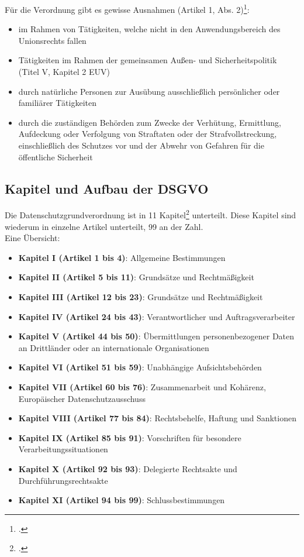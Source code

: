 Für die Verordnung gibt es gewisse Ausnahmen (Artikel 1, Abs. 2)\footcite{Lehrunterlagen-HTL-cloud}:
\begin{itemize}
	\item im Rahmen von Tätigkeiten, welche nicht in den Anwendungsbereich des Unionsrechts fallen
	\item Tätigkeiten im Rahmen der gemeinsamen Außen- und Sicherheitspolitik (Titel V, Kapitel 2 EUV)
	\item durch natürliche Personen zur Ausübung ausschließlich persönlicher oder familiärer Tätigkeiten
	\item durch die zuständigen Behörden zum Zwecke der Verhütung, Ermittlung, Aufdeckung oder Verfolgung von Straftaten oder der Strafvollstreckung, einschließlich des Schutzes vor und der Abwehr von Gefahren für die öffentliche Sicherheit
\end{itemize}

\subsection{Kapitel und Aufbau der DSGVO}
Die Datenschutzgrundverordnung ist in 11 Kapitel\footcite{dsgvo-wiki} unterteilt. Diese Kapitel sind wiederum in einzelne Artikel unterteilt, 99 an der Zahl.\\
Eine Übersicht:

\begin{itemize}
	\item \textbf{Kapitel I (Artikel 1 bis 4)}: Allgemeine Bestimmungen
	\item \textbf{Kapitel II (Artikel 5 bis 11)}: Grundsätze und Rechtmäßigkeit
	\item \textbf{Kapitel III (Artikel 12 bis 23)}: Grundsätze und Rechtmäßigkeit
	\item \textbf{Kapitel IV (Artikel 24 bis 43)}: Verantwortlicher und Auftragsverarbeiter
	\item \textbf{Kapitel V (Artikel 44 bis 50)}: Übermittlungen personenbezogener Daten an Drittländer oder an internationale Organisationen
	\item \textbf{Kapitel VI (Artikel 51 bis 59)}: Unabhängige Aufsichtsbehörden
	\item \textbf{Kapitel VII (Artikel 60 bis 76)}: Zusammenarbeit und Kohärenz, Europäischer Datenschutzausschuss
	\item \textbf{Kapitel VIII (Artikel 77 bis 84)}: Rechtsbehelfe, Haftung und Sanktionen
	\item \textbf{Kapitel IX (Artikel 85 bis 91)}: Vorschriften für besondere Verarbeitungssituationen
	\item \textbf{Kapitel X (Artikel 92 bis 93)}: Delegierte Rechtsakte und Durchführungsrechtsakte
	\item \textbf{Kapitel XI (Artikel 94 bis 99)}: Schlussbestimmungen
\end{itemize}

